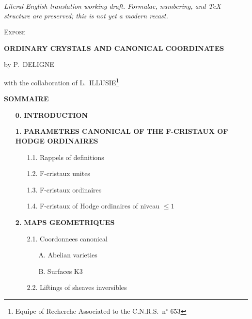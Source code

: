 \documentclass[12pt,a4paper]{article}
\theoremstyle{plain}
\theoremstyle{definition}
\theoremstyle{remark}
\begin{document}
\begin{center}\small\emph{Literal English translation working draft. Formulae, numbering, and TeX structure are preserved; this is not yet a modern recast.}\end{center}
\vspace{0.5em}


\thispagestyle{empty}

\begin{center}
{\Large\scshape Expose}

\vspace{1cm}

{\LARGE\bfseries ORDINARY CRYSTALS AND CANONICAL COORDINATES}

\vspace{1cm}

{\large by P.\ DELIGNE}

\vspace{0.5cm}

{with the collaboration of L.\ ILLUSIE}\footnote{Equipe of Recherche Associated to the C.N.R.S.\ n$^\circ$ 653}
\end{center}

\vspace{1cm}

\begin{center}
\textbf{SOMMAIRE}
\end{center}

\begin{itemize}[label={}, leftmargin=*, itemsep=0pt]
\item[\textbf{0.}] \textbf{INTRODUCTION}
\item[\textbf{1.}] \textbf{PARAMETRES CANONICAL OF THE F-CRISTAUX OF HODGE ORDINAIRES}
\begin{itemize}[label={}, leftmargin=2em, itemsep=0pt]
\item[1.1.] Rappels of definitions
\item[1.2.] F-cristaux unites
\item[1.3.] F-cristaux ordinaires
\item[1.4.] F-cristaux of Hodge ordinaires of niveau $\leq 1$
\end{itemize}
\item[\textbf{2.}] \textbf{MAPS GEOMETRIQUES}
\begin{itemize}[label={}, leftmargin=2em, itemsep=0pt]
\item[2.1.] Coordonnees canonical
\begin{itemize}[label={}, leftmargin=2em, itemsep=0pt]
\item[A.] Abelian varieties
\item[B.] Surfaces K3
\end{itemize}
\item[2.2.] Liftings of sheaves inversibles
\end{itemize}
\end{itemize}
\end{document}
